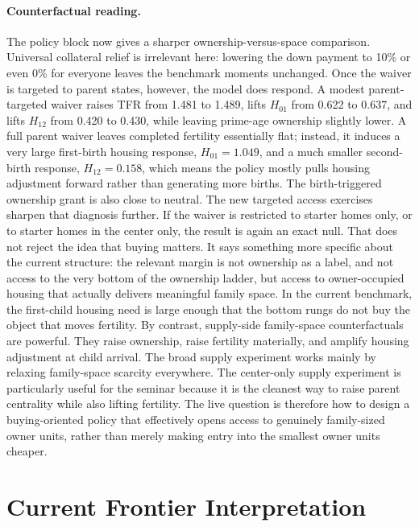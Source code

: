 \documentclass[11pt]{article}
\begin{document}
\paragraph{Counterfactual reading.} The policy block now gives a sharper ownership-versus-space comparison. Universal collateral relief is irrelevant here: lowering the down payment to 10\% or even 0\% for everyone leaves the benchmark moments unchanged. Once the waiver is targeted to parent states, however, the model does respond. A modest parent-targeted waiver raises TFR from 1.481 to 1.489, lifts $H_{01}$ from 0.622 to 0.637, and lifts $H_{12}$ from 0.420 to 0.430, while leaving prime-age ownership slightly lower. A full parent waiver leaves completed fertility essentially flat; instead, it induces a very large first-birth housing response, $H_{01}=1.049$, and a much smaller second-birth response, $H_{12}=0.158$, which means the policy mostly pulls housing adjustment forward rather than generating more births. The birth-triggered ownership grant is also close to neutral. The new targeted access exercises sharpen that diagnosis further. If the waiver is restricted to starter homes only, or to starter homes in the center only, the result is again an exact null. That does not reject the idea that buying matters. It says something more specific about the current structure: the relevant margin is not ownership as a label, and not access to the very bottom of the ownership ladder, but access to owner-occupied housing that actually delivers meaningful family space. In the current benchmark, the first-child housing need is large enough that the bottom rungs do not buy the object that moves fertility. By contrast, supply-side family-space counterfactuals are powerful. They raise ownership, raise fertility materially, and amplify housing adjustment at child arrival. The broad supply experiment works mainly by relaxing family-space scarcity everywhere. The center-only supply experiment is particularly useful for the seminar because it is the cleanest way to raise parent centrality while also lifting fertility. The live question is therefore how to design a buying-oriented policy that effectively opens access to genuinely family-sized owner units, rather than merely making entry into the smallest owner units cheaper.


\clearpage
\section{Current Frontier Interpretation}
\label{sec:tradeoff}
\end{document}
